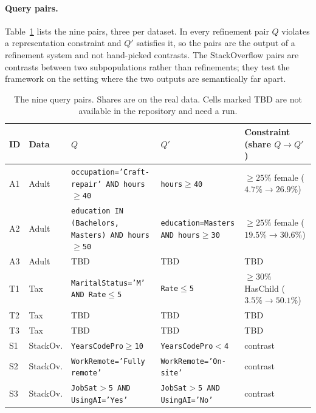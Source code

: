 \paragraph{Query pairs.}
Table~\ref{tab:query-pairs} lists the nine pairs, three per dataset.
In every refinement pair $Q$ violates a representation constraint and $Q'$ satisfies it, so the pairs are the output of a refinement system and not hand-picked contrasts.
The StackOverflow pairs are contrasts between two subpopulations rather than refinements; they test the framework on the setting where the two outputs are semantically far apart.

\begin{table}[t]
\centering
\small
\caption{The nine query pairs. Shares are on the real data. Cells marked TBD are not available in the repository and need a run.}
\label{tab:query-pairs}
\begin{tabular}{@{}llp{4.6cm}p{4.6cm}l@{}}
\toprule
ID & Data & $Q$ & $Q'$ & Constraint (share $Q\rightarrow Q'$)\\
\midrule
A1 & Adult & \texttt{occupation='Craft-repair' AND hours$\ge$40} & \texttt{hours$\ge$40} & $\ge25\%$ female ($4.7\%\rightarrow26.9\%$)\\
A2 & Adult & \texttt{education IN (Bachelors, Masters) AND hours$\ge$50} & \texttt{education=Masters AND hours$\ge$30} & $\ge25\%$ female ($19.5\%\rightarrow30.6\%$)\\
A3 & Adult & TBD & TBD & TBD\\
T1 & Tax & \texttt{MaritalStatus='M' AND Rate$\le$5} & \texttt{Rate$\le$5} & $\ge30\%$ HasChild ($3.5\%\rightarrow50.1\%$)\\
T2 & Tax & TBD & TBD & TBD\\
T3 & Tax & TBD & TBD & TBD\\
S1 & StackOv. & \texttt{YearsCodePro$\ge$10} & \texttt{YearsCodePro$<$4} & contrast\\
S2 & StackOv. & \texttt{WorkRemote='Fully remote'} & \texttt{WorkRemote='On-site'} & contrast\\
S3 & StackOv. & \texttt{JobSat$>$5 AND UsingAI='Yes'} & \texttt{JobSat$>$5 AND UsingAI='No'} & contrast\\
\bottomrule
\end{tabular}
\end{table}



